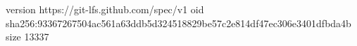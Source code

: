version https://git-lfs.github.com/spec/v1
oid sha256:93367267504ac561a63ddb5d324518829be57c2e814df47ec306e3401dfbda4b
size 13337
